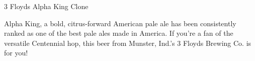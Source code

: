 \stylesection{\styleamericanpaleale}

\begin{recipie}{3 Floyds Alpha King Clone}

\begin{aboutblock}
Alpha King, a bold, citrus-forward American pale ale has been consistently ranked as
one of the best pale ales made in America. If you're a fan of the versatile Centennial
hop, this beer from Munster, Ind.'s 3 Floyds Brewing Co. is for you!
\end{aboutblock}


\begin{methodandtiming}
 
\begin{mashsteps}
\end{mashsteps}

\begin{fermentationsteps}
\end{fermentationsteps}

\end{methodandtiming}

\pagebreak

\begin{ingredientsblock}

\begin{malts}
\end{malts}

\begin{hops}
\end{hops}

\begin{yeasts}
\end{yeasts}

\end{ingredientsblock}

\end{recipie}

